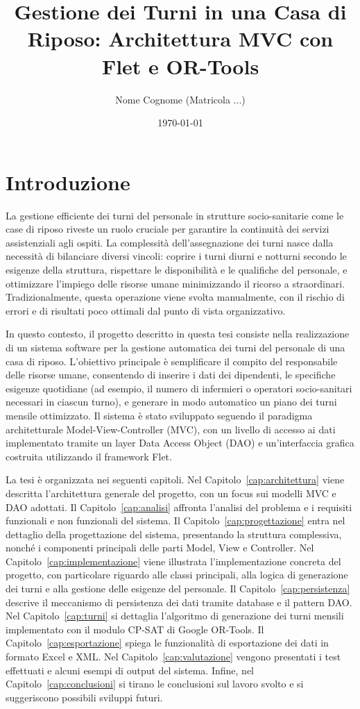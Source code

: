 \documentclass[a4paper,12pt]{report}
\title{Gestione dei Turni in una Casa di Riposo: Architettura MVC con Flet e OR-Tools}
\author{Nome Cognome (Matricola ...)}
\date{\today}
\begin{document}
\maketitle
\tableofcontents

\chapter{Introduzione}
La gestione efficiente dei turni del personale in strutture socio-sanitarie come le case di riposo riveste un ruolo cruciale per garantire la continuit\`a dei servizi assistenziali agli ospiti. La complessit\`a dell'assegnazione dei turni nasce dalla necessit\`a di bilanciare diversi vincoli: coprire i turni diurni e notturni secondo le esigenze della struttura, rispettare le disponibilit\`a e le qualifiche del personale, e ottimizzare l'impiego delle risorse umane minimizzando il ricorso a straordinari. Tradizionalmente, questa operazione viene svolta manualmente, con il rischio di errori e di risultati poco ottimali dal punto di vista organizzativo.

In questo contesto, il progetto descritto in questa tesi consiste nella realizzazione di un sistema software per la gestione automatica dei turni del personale di una casa di riposo. L'obiettivo principale \`e semplificare il compito del responsabile delle risorse umane, consentendo di inserire i dati dei dipendenti, le specifiche esigenze quotidiane (ad esempio, il numero di infermieri o operatori socio-sanitari necessari in ciascun turno), e generare in modo automatico un piano dei turni mensile ottimizzato. Il sistema \`e stato sviluppato seguendo il paradigma architetturale Model-View-Controller (MVC), con un livello di accesso ai dati implementato tramite un layer Data Access Object (DAO) e un'interfaccia grafica costruita utilizzando il framework Flet.

La tesi \`e organizzata nei seguenti capitoli. Nel Capitolo~\ref{cap:architettura} viene descritta l'architettura generale del progetto, con un focus sui modelli MVC e DAO adottati. Il Capitolo~\ref{cap:analisi} affronta l'analisi del problema e i requisiti funzionali e non funzionali del sistema. Il Capitolo~\ref{cap:progettazione} entra nel dettaglio della progettazione del sistema, presentando la struttura complessiva, nonch\'e i componenti principali delle parti Model, View e Controller. Nel Capitolo~\ref{cap:implementazione} viene illustrata l'implementazione concreta del progetto, con particolare riguardo alle classi principali, alla logica di generazione dei turni e alla gestione delle esigenze del personale. Il Capitolo~\ref{cap:persistenza} descrive il meccanismo di persistenza dei dati tramite database e il pattern DAO. Nel Capitolo~\ref{cap:turni} si dettaglia l'algoritmo di generazione dei turni mensili implementato con il modulo CP-SAT di Google OR-Tools. Il Capitolo~\ref{cap:esportazione} spiega le funzionalit\`a di esportazione dei dati in formato Excel e XML. Nel Capitolo~\ref{cap:valutazione} vengono presentati i test effettuati e alcuni esempi di output del sistema. Infine, nel Capitolo~\ref{cap:conclusioni} si tirano le conclusioni sul lavoro svolto e si suggeriscono possibili sviluppi futuri.
\end{document}
